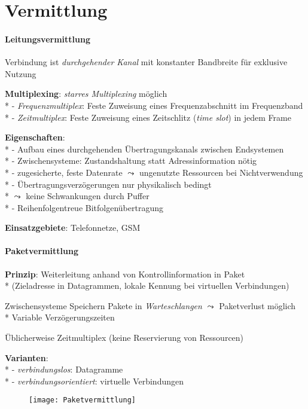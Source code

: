 \section{Vermittlung}

\paragraph{Leitungsvermittlung}
\begin{items}
  \item Verbindung ist \emph{durchgehender Kanal} mit konstanter Bandbreite für exklusive Nutzung
  \item \textbf{Multiplexing}: \emph{starres Multiplexing} möglich \\*
    - \emph{Frequenzmultiplex}: Feste Zuweisung eines Frequenzabschnitt im Frequenzband \\*
    - \emph{Zeitmultiplex}: Feste Zuweisung eines Zeitschlitz (\emph{time slot}) in jedem Frame
  \item \textbf{Eigenschaften}: \\*
    - Aufbau eines durchgehenden Übertragungskanals zwischen Endsystemen \\*
    - Zwischensysteme: Zustandshaltung statt Adressinformation nötig \\*
    - zugesicherte, feste Datenrate \( \leadsto \) ungenutzte Ressourcen bei Nichtverwendung \\*
    - Übertragungsverzögerungen nur physikalisch bedingt \\* \phantom{-} \phantom{-} \( \leadsto \) keine Schwankungen durch Puffer \\*
    - Reihenfolgentreue Bitfolgenübertragung
  \item \textbf{Einsatzgebiete}: Telefonnetze, GSM
\end{items}

\paragraph{Paketvermittlung}
\begin{items}
  \item \textbf{Prinzip}: Weiterleitung anhand von Kontrollinformation in Paket \\*
    (Zieladresse in Datagrammen, lokale Kennung bei virtuellen Verbindungen)
    \item Zwischensysteme Speichern Pakete in \emph{Warteschlangen} \( \leadsto \) Paketverlust möglich\\*
    	Variable Verzögerungszeiten
   \item Üblicherweise Zeitmultiplex (keine Reservierung von Ressourcen)
  \item \textbf{Varianten}: \\*
    - \emph{verbindungslos}: Datagramme \\*
    - \emph{verbindungsorientiert}: virtuelle Verbindungen
\end{items}
\begin{figure}[H]\centering\label{Paketvermittlung}\texttt{[image: Paketvermittlung]}\end{figure}

